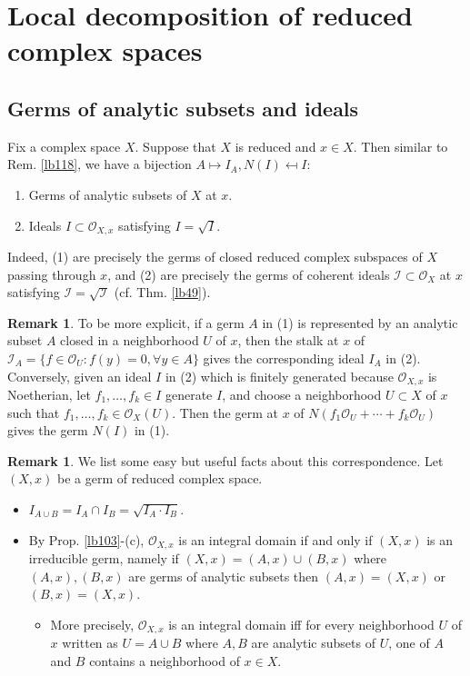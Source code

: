 \documentclass[12pt,b5paper,notitlepage]{report}
\theoremstyle{definition}
\newtheorem{rem}[df]{Remark}
\theoremstyle{plain}
\newcommand{\mc}{\mathcal}
\newcommand{\scr}{\mathscr}
\numberwithin{equation}{section}
\begin{document}
\section{Local decomposition of reduced complex spaces}


\subsection{Germs of analytic subsets and ideals}\label{lb157}


Fix a complex space $X$. Suppose that $X$ is reduced and $x\in X$. Then similar to Rem. \ref{lb118}, we have a bijection $A\mapsto I_A,N(I)\mapsfrom I$:
\begin{enumerate}[label=(\arabic*)]
\item Germs of analytic subsets of $X$ at $x$.
\item Ideals $I\subset\scr O_{X,x}$ satisfying $I=\sqrt I$.
\end{enumerate}
Indeed, (1) are precisely the germs of closed reduced complex subspaces of $X$ passing through $x$, and (2) are precisely the germs of coherent ideals $\mc I\subset\scr O_X$ at $x$ satisfying $\mc I=\sqrt{\mc I}$ (cf. Thm. \ref{lb49}). 

\begin{rem}
To be more explicit, if a germ $A$ in (1) is represented by an analytic subset $A$ closed in a neighborhood $U$ of $x$, then the stalk at $x$ of $\scr I_A=\{f\in\scr O_U:f(y)=0,\forall y\in A\}$ gives the corresponding ideal $I_A$ in (2). Conversely, given an ideal $I$ in (2) which is finitely generated because $\scr O_{X,x}$ is Noetherian, let $f_1,\dots,f_k\in I$ generate $I$, and choose a neighborhood $U\subset X$ of $x$ such that $f_1,\dots,f_k\in\scr O_X(U)$. Then the germ at $x$ of $N(f_1\scr O_U+\cdots+f_k\scr O_U)$ gives the germ $N(I)$ in (1).
\end{rem}




\begin{rem}\label{lb128}
We list some easy but useful facts about this correspondence. Let $(X,x)$ be a germ of reduced complex space.
\begin{itemize}
\item $I_{A\cup B}=I_A\cap I_B=\sqrt{I_A\cdot I_B}$.
\item By Prop. \ref{lb103}-(c), $\scr O_{X,x}$ is an integral domain if and only if $(X,x)$ is an irreducible germ, namely if $(X,x)=(A,x)\cup (B,x)$ where $(A,x),(B,x)$ are germs of analytic subsets then $(A,x)=(X,x)$ or $(B,x)=(X,x)$.
\begin{itemize}
\item More precisely, $\scr O_{X,x}$ is an integral domain iff for every neighborhood $U$ of $x$ written as $U=A\cup B$ where $A,B$ are analytic subsets of $U$, one of $A$ and $B$ contains a neighborhood of $x\in X$.
\end{itemize}
\end{itemize}
\end{rem}
\end{document}
